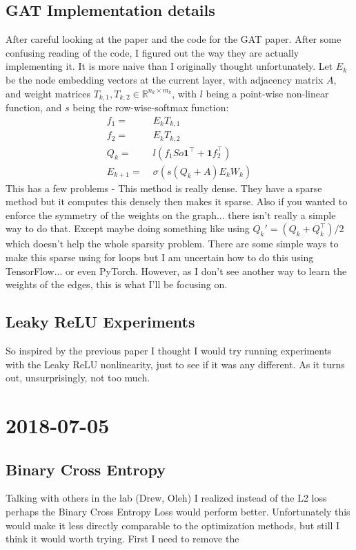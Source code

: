 \documentclass[a4paper]{article}
\newcommand{\DatestampYMD}[3]{\mbox{#1-#2-#3}}
\newcommand{\entry}[3]{\newpage\section*{\DatestampYMD{#1}{#2}{#3}} }
\begin{document}
\subsection*{GAT Implementation details}
After careful looking at the paper and the code for the GAT paper. After some confusing reading of the code, I figured out the way they are actually implementing it. It is more naive than I originally thought unfortunately. Let $E_k$ be the node embedding vectors at the current layer, with adjacency matrix $A$, and weight matrices $T_{k,1}, T_{k,2} \in \mathbb{R}^{n_k \times m_k}$, with $l$ being a point-wise non-linear function, and $s$ being the row-wise-softmax function:
\begin{align*}
f_1 =&\; E_k T_{k,1} \\
f_2 =&\; E_k T_{k,2} \\
Q_k =&\; l(f_1 So \mathbf{1}^\top + \mathbf{1} f_2^\top) \\
E_{k+1} =&\; \sigma \left( s(Q_k + A) E_k W_k \right)
\end{align*}
This has a few problems - This method is really dense. They have a sparse method but it computes this densely then makes it sparse. Also if you wanted to enforce the symmetry of the weights on the graph... there isn't really a simple way to do that. Except maybe doing something like using $Q_k' = (Q_k + Q_k^\top)/2$ which doesn't help the whole sparsity problem. There are some simple ways to make this sparse using for loops but I am uncertain how to do this using TensorFlow... or even PyTorch. However, as I don't see another way to learn the weights of the edges, this is what I'll be focusing on. 

\subsection*{Leaky ReLU Experiments}
So inspired by the previous paper I thought I would try running experiments with the Leaky ReLU nonlinearity, just to see if it was any different. As it turns out, unsurprisingly, not too much.

\entry{2018}{07}{05}
\subsection*{Binary Cross Entropy}
Talking with others in the lab (Drew, Oleh) I realized instead of the L2 loss perhaps the Binary Cross Entropy Loss would perform better. Unfortunately this would make it less directly comparable to the optimization methods, but still I think it would worth trying. First I need to remove the 
\end{document}
